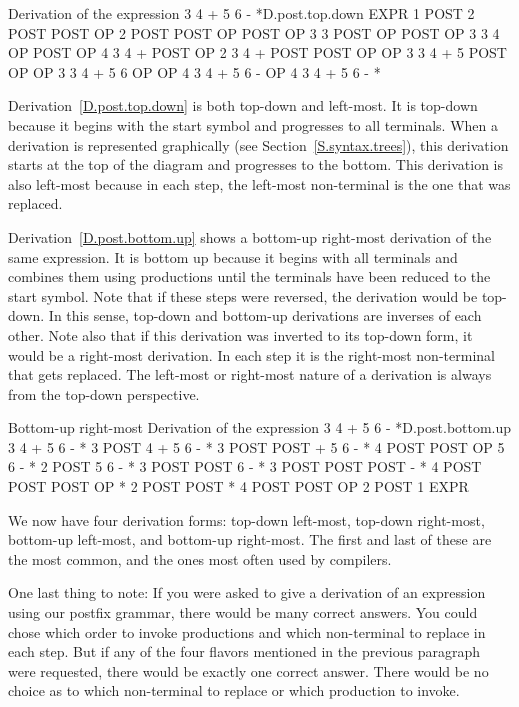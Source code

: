 \documentclass[letterpaper,12pt,openany,reqno]{book}%
\begin{document}
\begin{derivation}{Derivation of the expression 3 4 + 5 6 - *}{D.post.top.down}
    EXPR
1   POST
2   POST POST OP
2   POST POST OP POST OP
3   3 POST OP POST OP
3   3 4 OP POST OP
4   3 4 + POST OP
2   3 4 + POST POST OP OP
3   3 4 + 5 POST OP OP
3   3 4 + 5 6 OP OP
4   3 4 + 5 6 - OP
4   3 4 + 5 6 - *
\end{derivation}
Derivation~\ref{D.post.top.down} is both top-down and left-most. It is top-down because it begins with the start symbol and progresses to all terminals. When a derivation is represented graphically (see Section~\ref{S.syntax.trees}), this derivation starts at the top of the diagram and progresses to the bottom. This derivation is also left-most because in each step, the left-most non-terminal is the one that was replaced.

Derivation~\ref{D.post.bottom.up} shows a bottom-up right-most derivation of the same expression. It is bottom up because it begins with all terminals and combines them using productions until the terminals have been reduced to the start symbol. Note that if these steps were reversed, the derivation would be top-down. In this sense, top-down and bottom-up derivations are inverses of each other. Note also that if this derivation was inverted to its top-down form, it would be a right-most derivation. In each step it is the right-most non-terminal that gets replaced. The left-most or right-most nature of a derivation is always from the top-down perspective.
\begin{derivation}{Bottom-up right-most Derivation of the expression 3 4 + 5 6 - *}{D.post.bottom.up}
    3 4 + 5 6 - *
3   POST 4 + 5 6 - *
3   POST POST + 5 6 - *
4   POST POST OP 5 6 - *
2   POST 5 6 - *
3   POST POST 6 - *
3   POST POST POST - *
4   POST POST POST OP *
2   POST POST *
4   POST POST OP
2   POST
1   EXPR
\end{derivation}

We now have four derivation forms: top-down left-most, top-down right-most, bottom-up left-most, and bottom-up right-most. The first and last of these are the most common, and the ones most often used by compilers. 

One last thing to note: If you were asked to give a derivation of an expression using our postfix grammar, there would be many correct answers. You could chose which order to invoke productions and which non-terminal to replace in each step. But if any of the four flavors mentioned in the previous paragraph were requested, there would be exactly one correct answer. There would be no choice as to which non-terminal to replace or which production to invoke. 
\end{document}
